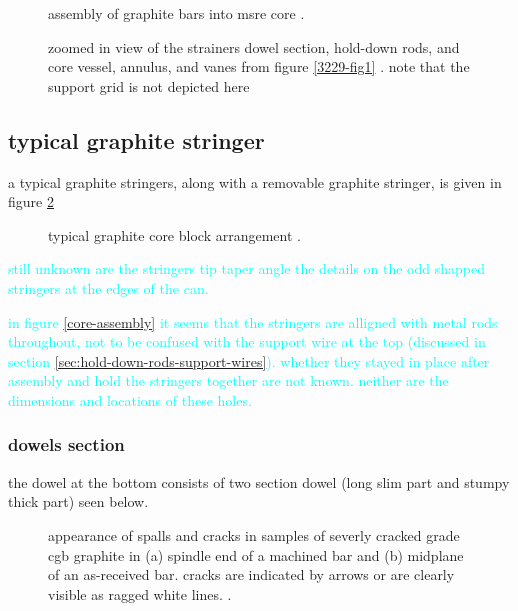 \documentclass{article}
\begin{document}
\begin{preview}
\begin{figure}[H]
  \centering
  \caption{assembly of graphite bars into msre core \parencite[figure 40]{ornl-3708}.}
  \label{3708-fig40}
\end{figure}


\begin{figure}[H]
  \centering
  \caption{zoomed in view of the strainers dowel section, hold-down rods, and core vessel, annulus, and vanes from figure \ref{3229-fig1} \parencite[figure 1]{ornl-tm-3229}. note that the support grid is not depicted here}
\end{figure}
%
\subsection{typical graphite stringer}
a typical graphite stringers, along with a removable graphite stringer, is given in figure \ref{3229-fig2}
\begin{figure}[H]
  \centering
  \centering
  \caption{typical graphite core block arrangement \parencite[figure 2]{ornl-tm-3229}.}
  \label{3229-fig2}
\end{figure}

\textcolor{cyan}{still unknown are the stringers tip taper angle the details on the odd shapped stringers at the edges of the can.}

\textcolor{cyan}{in figure \ref{core-assembly} it seems that the stringers are alligned with metal rods throughout, not to be confused with the support wire at the top (discussed in section \ref{sec:hold-down-rods-support-wires}). whether they stayed in place after assembly and hold the stringers together are not known. neither are the dimensions and locations of these holes.}

\subsubsection{dowels section}
the dowel at the bottom consists of two section dowel (long slim part and stumpy thick part) seen below.
\begin{figure}[H]
  \centering
  \caption{appearance of spalls and cracks in samples of severly cracked grade cgb graphite in (a) spindle end of a machined bar and (b) midplane of an as-received bar. cracks are indicated by arrows or are clearly visible as ragged white lines. \parencite[figure 4]{ornl-3708}.}
  \label{3708-fig4}
\end{figure}


\end{preview}
\end{document}
